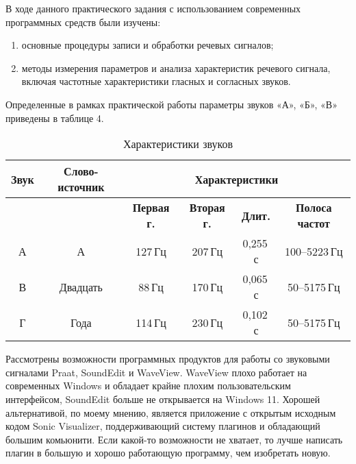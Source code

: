 \conclusion

В ходе данного практического задания с использованием современных программных
средств были изучены:
\begin{enumerate}
    \item основные процедуры записи и обработки речевых сигналов;
    \item методы измерения параметров и анализа характеристик речевого сигнала,
          включая частотные характеристики гласных и согласных звуков.
\end{enumerate}

Определенные в рамках практической работы параметры звуков «А», «Б», «В»
приведены в таблице 4.

\begin{table}[ht]
\centering
\caption{Характеристики звуков}
\begin{tabular}{|c|c|cccc|}
\hline
\textbf{Звук} & \textbf{Слово-источник} & \multicolumn{4}{c|}{\textbf{Характеристики}} \\
\hline
             &                         & \textbf{Первая г.} & \textbf{Вторая г.} & \textbf{Длит.} & \textbf{Полоса частот} \\
\hline
А & А     & 127\,Гц   & 207\,Гц  & 0,255\,с   & 100--5223\,Гц \\
\hline
В & Двадцать & 88\,Гц   & 170\,Гц  & 0,065\,с  & 50--5175\,Гц \\
\hline
Г & Года & 114\,Гц   & 230\,Гц   & 0,102\,с  & 50--5175\,Гц \\
\hline
\end{tabular}
\end{table}

Рассмотрены возможности программных продуктов для работы со звуковыми сигналами
Praat, SoundEdit и WaveView. WaveView плохо работает на современных Windows и
обладает крайне плохим пользовательским интерфейсом, SoundEdit больше не
открывается на Windows 11. Хорошей альтернативой, по моему мнению, является
приложение с открытым исходным кодом Sonic Visualizer, поддерживающий систему
плагинов и обладающий большим комьюнити. Если какой-то возможности не хватает,
то лучше написать плагин в большую и хорошо работающую программу, чем
изобретать новую.
